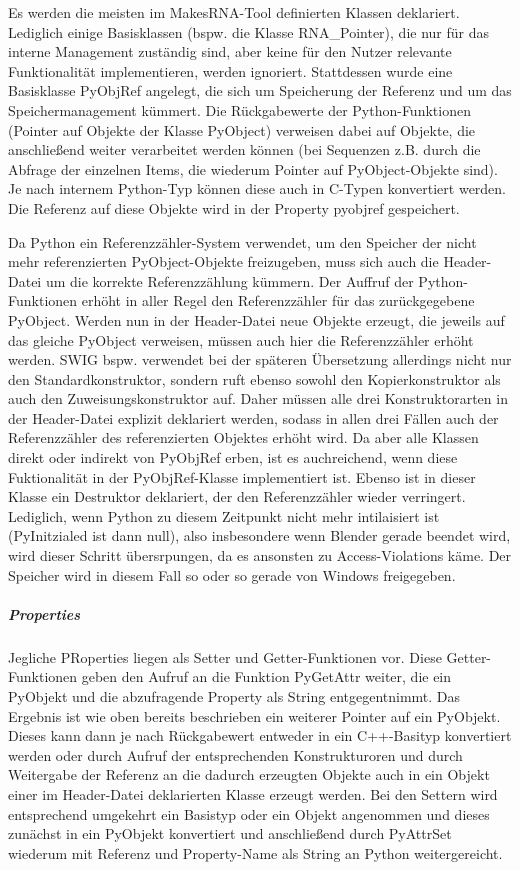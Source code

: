 Es werden die meisten im MakesRNA-Tool definierten Klassen deklariert. Lediglich einige Basisklassen (bspw. die Klasse RNA\_Pointer), die nur für das interne Management zuständig sind, aber keine für den Nutzer relevante Funktionalität implementieren, werden ignoriert. Stattdessen wurde eine Basisklasse PyObjRef angelegt, die sich um Speicherung der Referenz und um das Speichermanagement kümmert. Die Rückgabewerte der Python-Funktionen (Pointer auf Objekte der Klasse PyObject) verweisen dabei auf Objekte, die anschließend weiter verarbeitet werden können (bei Sequenzen z.B. durch die Abfrage der einzelnen Items, die wiederum Pointer auf PyObject-Objekte sind). Je nach internem Python-Typ können diese auch in C-Typen konvertiert werden. Die Referenz auf diese Objekte wird in der Property pyobjref gespeichert.

Da Python ein Referenzzähler-System verwendet, um den Speicher der nicht mehr referenzierten PyObject-Objekte freizugeben, muss sich auch die Header-Datei um die korrekte Referenzzählung kümmern. Der Auffruf der Python-Funktionen erhöht in aller Regel den Referenzzähler für das zurückgegebene PyObject. Werden nun in der Header-Datei neue Objekte erzeugt, die jeweils auf das gleiche PyObject verweisen, müssen auch hier die Referenzzähler erhöht werden. SWIG bspw. verwendet bei der späteren Übersetzung allerdings nicht nur den Standardkonstruktor, sondern ruft ebenso sowohl den Kopierkonstruktor als auch den Zuweisungskonstruktor auf. Daher müssen alle drei Konstruktorarten in der Header-Datei explizit deklariert werden, sodass in allen drei Fällen auch der Referenzzähler des referenzierten Objektes erhöht wird. Da aber alle Klassen direkt oder indirekt von PyObjRef erben, ist es auchreichend, wenn diese Fuktionalität in der PyObjRef-Klasse implementiert ist. Ebenso ist in dieser Klasse ein Destruktor deklariert, der den Referenzzähler wieder verringert. Lediglich, wenn Python zu diesem Zeitpunkt nicht mehr intilaisiert ist (PyInitzialed ist dann null), also insbesondere wenn Blender gerade beendet wird, wird dieser Schritt übersrpungen, da es ansonsten zu Access-Violations käme. Der Speicher wird in diesem Fall so oder so gerade von Windows freigegeben.

\subparagraph{Properties}

Jegliche PRoperties liegen als Setter und Getter-Funktionen vor. Diese Getter-Funktionen geben den Aufruf an die Funktion PyGetAttr weiter, die ein PyObjekt und die abzufragende Property als String entgegentnimmt. Das Ergebnis ist wie oben bereits beschrieben ein weiterer Pointer auf ein PyObjekt. Dieses kann dann je nach Rückgabewert entweder in ein C++-Basityp konvertiert werden oder durch Aufruf der entsprechenden Konstrukturoren und durch Weitergabe der Referenz an die dadurch erzeugten Objekte auch in ein Objekt einer im Header-Datei deklarierten Klasse erzeugt werden. Bei den Settern wird entsprechend umgekehrt ein Basistyp oder ein Objekt angenommen und dieses zunächst in ein PyObjekt konvertiert und anschließend durch PyAttrSet wiederum mit Referenz und Property-Name als String an Python weitergereicht.

